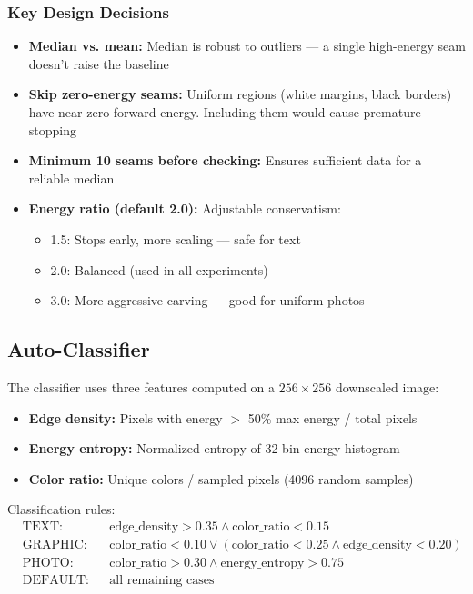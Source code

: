 \documentclass[12pt,a4paper]{article}
\begin{document}
\subsubsection{Key Design Decisions}

\begin{itemize}
    \item \textbf{Median vs. mean:} Median is robust to outliers — a single high-energy seam doesn't raise the baseline
    \item \textbf{Skip zero-energy seams:} Uniform regions (white margins, black borders) have near-zero forward energy. Including them would cause premature stopping
    \item \textbf{Minimum 10 seams before checking:} Ensures sufficient data for a reliable median
    \item \textbf{Energy ratio (default 2.0):} Adjustable conservatism:
    \begin{itemize}
        \item 1.5: Stops early, more scaling — safe for text
        \item 2.0: Balanced (used in all experiments)
        \item 3.0: More aggressive carving — good for uniform photos
    \end{itemize}
\end{itemize}

\subsection{Auto-Classifier}

The classifier uses three features computed on a $256\times 256$ downscaled image:

\begin{itemize}
    \item \textbf{Edge density:} Pixels with energy $>$ 50\% max energy / total pixels
    \item \textbf{Energy entropy:} Normalized entropy of 32-bin energy histogram
    \item \textbf{Color ratio:} Unique colors / sampled pixels (4096 random samples)
\end{itemize}

Classification rules:
\begin{align*}
    &\text{TEXT:} &&\text{edge\_density} > 0.35 \land \text{color\_ratio} < 0.15 \\
    &\text{GRAPHIC:} &&\text{color\_ratio} < 0.10 \lor (\text{color\_ratio} < 0.25 \land \text{edge\_density} < 0.20) \\
    &\text{PHOTO:} &&\text{color\_ratio} > 0.30 \land \text{energy\_entropy} > 0.75 \\
    &\text{DEFAULT:} &&\text{all remaining cases}
\end{align*}
\end{document}
